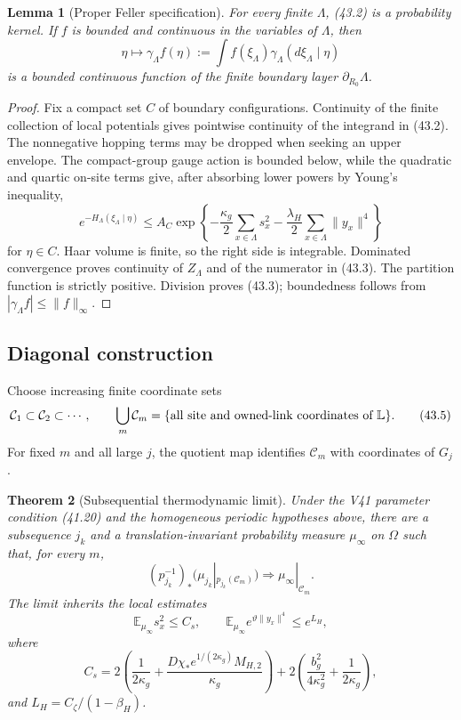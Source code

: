 \documentclass[11pt]{article}
\newtheorem{theorem}{Theorem}[section]
\newtheorem{lemma}[theorem]{Lemma}
\theoremstyle{remark}
\begin{document}
\begin{lemma}[Proper Feller specification]
\label{lem:v17v43-feller}
For every finite \(\Lambda\), (43.2) is a probability kernel.  If \(f\)
is bounded and continuous in the variables of \(\Lambda\), then
\[
 \eta\longmapsto\gamma_\Lambda f(\eta)
 :=\int f(\xi_\Lambda)
 \gamma_\Lambda(d\xi_\Lambda\mid\eta)             \tag{43.3}
\]
is a bounded continuous function of the finite boundary layer
\(\partial_{R_0}\Lambda\).
\end{lemma}

\begin{proof}
Fix a compact set \(C\) of boundary configurations.  Continuity of the
finite collection of local potentials gives pointwise continuity of
the integrand in (43.2).  The nonnegative hopping terms may be dropped
when seeking an upper envelope.  The compact-group gauge action is
bounded below, while the quadratic and quartic on-site terms give,
after absorbing lower powers by Young's inequality,
\[
 e^{-H_\Lambda(\xi_\Lambda\mid\eta)}
 \leq A_C
 \exp\left\{
 -\frac{\kappa_g}{2}\sum_{x\in\Lambda}s_x^2
 -\frac{\lambda_H}{2}\sum_{x\in\Lambda}\|y_x\|^4
 \right\}                                        \tag{43.4}
\]
for \(\eta\in C\).  Haar volume is finite, so the right side is
integrable.  Dominated convergence proves continuity of
\(Z_\Lambda\) and of the numerator in (43.3).  The partition function
is strictly positive.  Division proves (43.3); boundedness follows
from \(|\gamma_\Lambda f|\leq\|f\|_\infty\).
\end{proof}

\subsection{Diagonal construction}

Choose increasing finite coordinate sets
\[
 \mathcal C_1\subset\mathcal C_2\subset\cdots,
 \qquad
 \bigcup_m\mathcal C_m
 =
 \{\hbox{all site and owned-link coordinates of }\mathbb L\}.   \tag{43.5}
\]
For fixed \(m\) and all large \(j\), the quotient map identifies
\(\mathcal C_m\) with coordinates of \(G_j\).

\begin{theorem}[Subsequential thermodynamic limit]
\label{thm:v17v43-limit}
Under the V41 parameter condition (41.20) and the homogeneous periodic
hypotheses above, there are a subsequence \(j_k\) and a
translation-invariant probability measure \(\mu_\infty\) on \(\Omega\)
such that, for every \(m\),
\[
 (p_{j_k}^{-1})_*
 \bigl(\mu_{j_k}|_{p_{j_k}(\mathcal C_m)}\bigr)
 \Longrightarrow
 \mu_\infty|_{\mathcal C_m}.                       \tag{43.6}
\]
The limit inherits the local estimates
\[
 \mathbb E_{\mu_\infty}s_x^2\leq C_s,\qquad
 \mathbb E_{\mu_\infty}
 e^{\vartheta\|y_x\|^4}\leq e^{L_H},               \tag{43.7}
\]
where
\[
 C_s=
 2\left(
 \frac1{2\kappa_g}
 +\frac{D\chi_*e^{1/(2\kappa_g)}M_{H,2}}{\kappa_g}
 \right)
 +2\left(
 \frac{b_g^2}{4\kappa_g^2}+\frac1{2\kappa_g}
 \right),                                         \tag{43.8}
\]
and \(L_H=C_\zeta/(1-\beta_H)\).
\end{theorem}
\end{document}
